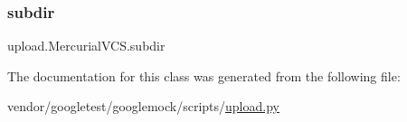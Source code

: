 \mbox{\label{classupload_1_1_mercurial_v_c_s_a0dad32e621f5523e3430d867184f0b42}} 
\subsubsection{\texorpdfstring{subdir}{subdir}}
{\footnotesize\ttfamily upload.\+Mercurial\+V\+C\+S.\+subdir}



The documentation for this class was generated from the following file\+:\begin{DoxyCompactItemize}
\item 
vendor/googletest/googlemock/scripts/\hyperlink{googlemock_2scripts_2upload_8py}{upload.\+py}\end{DoxyCompactItemize}
